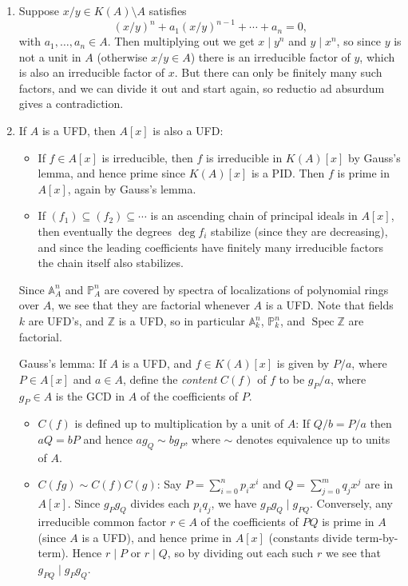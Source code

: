 \documentclass{report}
\newcommand{\divides}{\mathrel{\mid}} %
\newcommand{\A}{\mathbb{A}}
\renewcommand{\P}{\mathbb{P}} %
\newcommand{\Z}{\mathbb{Z}}
\DeclareMathOperator{\Spec}{Spec}
\begin{document}
\begin{enumerate}[label=\textbf{5.4.\Alph*.}]
	\item Suppose $x/y\in K(A)\setminus A$ satisfies
	      \begin{equation*}
		      (x/y)^n + a_1(x/y)^{n-1} + \cdots + a_n = 0,
	      \end{equation*}
	      with $a_1,\ldots,a_n\in A$. Then multiplying out we get $x\divides y^n$
	      and $y\divides x^n$, so since $y$ is not a unit in $A$ (otherwise
	      $x/y\in A$) there is an irreducible factor of $y$, which is also an
	      irreducible factor of $x$. But there can only be finitely many such
	      factors, and we can divide it out and start again, so reductio ad
	      absurdum gives a contradiction.

	\item If $A$ is a UFD, then $A[x]$ is also a UFD:
	      \begin{itemize}
		      \item If $f\in A[x]$ is irreducible, then $f$ is irreducible in
		            $K(A)[x]$ by Gauss's lemma, and hence prime since $K(A)[x]$ is a
		            PID. Then $f$ is prime in $A[x]$, again by Gauss's lemma.

		      \item If $(f_1)\subseteq(f_2)\subseteq\cdots$ is an ascending chain
		            of principal ideals in $A[x]$, then eventually the degrees
		            $\deg f_i$ stabilize (since they are decreasing), and since the
		            leading coefficients have finitely many irreducible factors the
		            chain itself also stabilizes.
	      \end{itemize}
	      Since $\A^n_A$ and $\P^n_A$ are covered by spectra of localizations of
	      polynomial rings over $A$, we see that they are factorial whenever $A$
	      is a UFD. Note that fields $k$ are UFD's, and $\Z$ is a UFD, so in
	      particular $\A^n_k$, $\P^n_k$, and $\Spec\Z$ are factorial.

	      Gauss's lemma: If $A$ is a UFD, and $f\in K(A)[x]$ is given by $P/a$,
	      where $P\in A[x]$ and $a\in A$, define the \emph{content} $C(f)$ of $f$
	      to be $g_P/a$, where $g_P\in A$ is the GCD in $A$ of the coefficients of
	      $P$.
	      \begin{itemize}
		      \item $C(f)$ is defined up to multiplication by a unit of $A$: If
		            $Q/b=P/a$ then $aQ=bP$ and hence $ag_Q\sim bg_P$, where $\sim$
		            denotes equivalence up to units of $A$.

		      \item $C(fg)\sim C(f)C(g)$: Say $P=\sum_{i=0}^np_ix^i$ and
		            $Q=\sum_{j=0}^mq_jx^j$ are in $A[x]$. Since $g_Pg_Q$ divides
		            each $p_iq_j$, we have $g_Pg_Q\divides g_{PQ}$. Conversely, any
		            irreducible common factor $r\in A$ of the coefficients of $PQ$
		            is prime in $A$ (since $A$ is a UFD), and hence prime in $A[x]$
		            (constants divide term-by-term). Hence $r\divides P$ or
		            $r\divides Q$, so by dividing out each such $r$ we see that
		            $g_{PQ}\divides g_Pg_Q$.


\end{itemize}
\end{enumerate}
\end{document}

